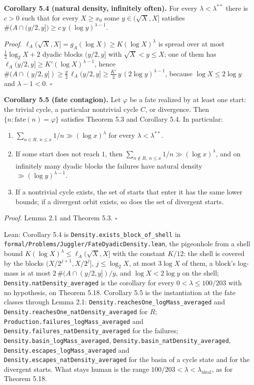\documentclass[11pt,a4paper]{article}
\providecommand{\tightlist}{\setlength{\itemsep}{0pt}\setlength{\parskip}{0pt}}
\begin{document}
\textbf{Corollary 5.4 (natural density, infinitely often).} For every
\(\lambda<\lambda^{**}\) there is \(c>0\) such that for every
\(X\ge x_0\) some \(y\in(\sqrt X,X]\) satisfies
\(\#\bigl(A\cap(y/2,y]\bigr)\ge c\,y\,(\log y)^{\lambda-1}\).

\emph{Proof.} \(\ell_A(\sqrt X,X]=g_A(\log X)\ge K(\log X)^\lambda\) is
spread over at most \(\tfrac12\log_2X+2\) dyadic blocks \((y/2,y]\) with
\(\sqrt X<y\le X\); one of them has
\(\ell_A(y/2,y]\ge K'(\log X)^{\lambda-1}\), hence
\(\#(A\cap(y/2,y])\ge\tfrac y2\,\ell_A(y/2,y]\ge\tfrac{K'}2\,y\,(2\log y)^{\lambda-1}\),
because \(\log X\le 2\log y\) and \(\lambda-1<0\). \(\square\)

\textbf{Corollary 5.5 (fate contagion).} Let \(\varphi\) be a fate
realized by at least one start: the trivial cycle, a particular
nontrivial cycle \(C\), or divergence. Then
\(\{n:\mathrm{fate}(n)=\varphi\}\) satisfies Theorem 5.3 and Corollary
5.4. In particular:

\begin{enumerate}
\def\labelenumi{\arabic{enumi}.}
\tightlist
\item
  \(\sum_{n\in R,\ n\le x}1/n\gg(\log x)^{\lambda}\) for every
  \(\lambda<\lambda^{**}\).
\item
  If some start does not reach \(1\), then
  \(\sum_{n\notin R,\ n\le x}1/n\gg(\log x)^{\lambda}\), and on
  infinitely many dyadic blocks the failures have natural density
  \(\gg(\log y)^{\lambda-1}\).
\item
  If a nontrivial cycle exists, the set of starts that enter it has the
  same lower bounds; if a divergent orbit exists, so does the set of
  divergent starts.
\end{enumerate}

\emph{Proof.} Lemma 2.1 and Theorem 5.3. \(\square\)

Lean: Corollary 5.4 is
\texttt{\nolinkurl{Density.exists_block_of_shell}} in
\texttt{\nolinkurl{formal/Problems/Juggler/FateDyadicDensity.lean}}, the
pigeonhole from a shell bound \(K(\log X)^\lambda\le\ell_A(\sqrt X,X]\)
with the constant \(K/12\): the shell is covered by the blocks
\((X/2^{j+1},X/2^j]\), \(j\le\log_2X\), at most \(3\log X\) of them, a
block's log-mass is at most \(2\,\#(A\cap(y/2,y])/y\), and
\(\log X<2\log y\) on the shell;
\texttt{\nolinkurl{Density.natDensity_averaged}} is the corollary for
every \(0<\lambda\le100/203\) with no hypothesis, on Theorem 5.18.
Corollary 5.5 is the instantiation at the fate classes through Lemma
2.1: \texttt{\nolinkurl{Density.reachesOne_logMass_averaged}} and
\texttt{\nolinkurl{Density.reachesOne_natDensity_averaged}} for \(R\);
\texttt{\nolinkurl{Production.failures_logMass_averaged}} and
\texttt{\nolinkurl{Density.failures_natDensity_averaged}} for the
failures; \texttt{\nolinkurl{Density.basin_logMass_averaged}},
\texttt{\nolinkurl{Density.basin_natDensity_averaged}},
\texttt{\nolinkurl{Density.escapes_logMass_averaged}} and
\texttt{\nolinkurl{Density.escapes_natDensity_averaged}} for the basin
of a cycle state and for the divergent starts. What stays human is the
range \(100/203<\lambda<\lambda_{\mathrm{ideal}}\), as for Theorem 5.18.
\end{document}
